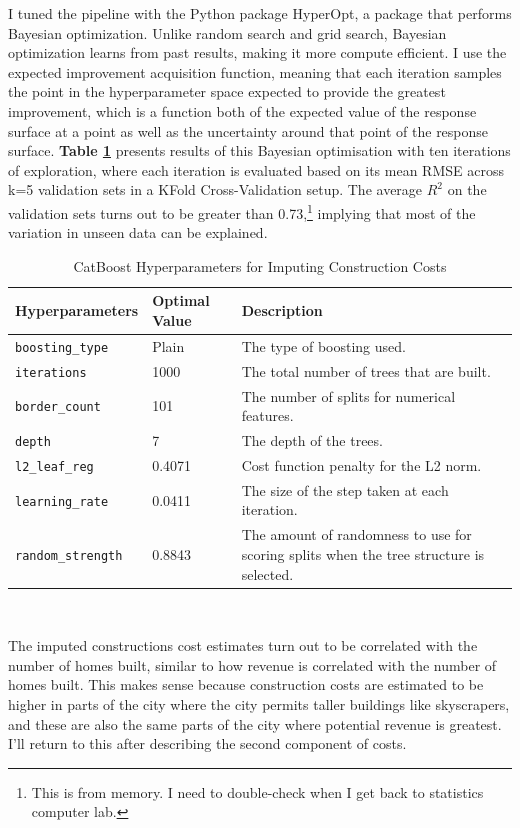 \documentclass[a4paper,12pt]{article}
\begin{document}
I tuned the pipeline with the Python package HyperOpt, a package that performs Bayesian optimization. Unlike random search and grid search, Bayesian optimization learns from past results, making it more compute efficient. I use the expected improvement acquisition function, meaning that each iteration samples the point in the hyperparameter space expected to provide the greatest improvement, which is a function both of the expected value of the response surface at a point as well as the uncertainty around that point of the response surface. \textbf{Table \ref{tab:BoostedCatHyperparameters}} presents results of this Bayesian optimisation with ten iterations of exploration, where each iteration is evaluated based on its mean RMSE across k=5 validation sets in a KFold Cross-Validation setup. The average $R^{2}$ on the validation sets turns out to be greater than 0.73,\footnote{This is from memory. I need to double-check when I get back to statistics computer lab.} implying that most of the variation in unseen data can be explained. 




\begin {table}[tbhp]
\centering
\caption {CatBoost Hyperparameters for Imputing Construction Costs}
\begin{tabular} { @{} p{4cm} p{2cm} p{8cm} @{} }
\toprule
\textbf{Hyperparameters}  & \textbf{Optimal Value} & \textbf{Description}\\
\midrule 
\texttt{boosting\_type} & Plain & The type of boosting used.\\
\texttt{iterations} & 1000 & The total number of trees that are built. \\
\texttt{border\_count} & 101 & The number of splits for numerical features.\\
\texttt{depth} & 7 & The depth of the trees.\\
\texttt{l2\_leaf\_reg} & 0.4071 & Cost function penalty for the L2 norm. \\ 
\texttt{learning\_rate} & 0.0411 & The size of the step taken at each iteration. \\
\texttt{random\_strength} & 0.8843 & The amount of randomness to use for scoring splits when the tree structure is selected. \\
\bottomrule 
\end{tabular}\\
\label{tab:BoostedCatHyperparameters}
\end {table}

The imputed constructions cost estimates turn out to be correlated with the number of homes built, similar to how revenue is correlated with the number of homes built. This makes sense because construction costs are estimated to be higher in parts of the city where the city permits taller buildings like skyscrapers, and these are also the same parts of the city where potential revenue is greatest. I'll return to this after describing the second component of costs.
\end{document}
